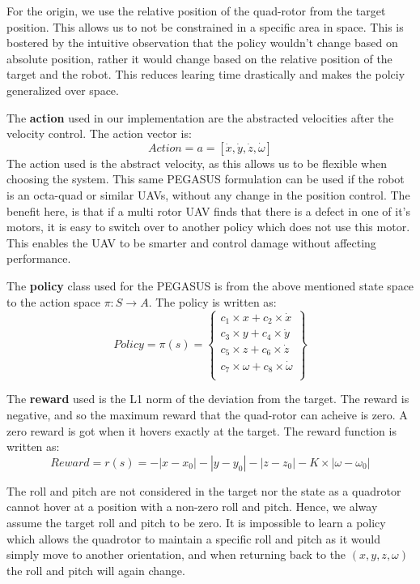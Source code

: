 \documentclass[BTech]{iitmdiss}
\begin{document}
For the origin, we use the relative position of the quad-rotor from the target position. This allows us to not be constrained in a specific area in space. This is bostered by the intuitive observation that the policy wouldn't change based on absolute position, rather it would change based on the relative position of the target and the robot. This reduces learing time drastically and makes the polciy generalized over space.

The {\bf action} used in our implementation are the abstracted velocities after the velocity control. The action vector is:
\begin{equation}
  Action = a = [\dot{x}, \dot{y}, \dot{z}, \dot{\omega}]
\end{equation}
The action used is the abstract velocity, as this allows us to be flexible when choosing the system. This same PEGASUS formulation can be used if the robot is an octa-quad or similar UAVs, without any change in the position control. The benefit here, is that if a multi rotor UAV finds that there is a defect in one of it's motors, it is easy to switch over to another policy which does not use this motor. This enables the UAV to be smarter and control damage without affecting performance.

The {\bf policy} class used for the PEGASUS is from the above mentioned state space to the action space $\pi: S \rightarrow A$. The policy is written as:
\begin{equation}
  Policy = \pi(s) = \left\{
    \begin{array}{c}
      c_1 \times x + c_2 \times \dot{x} \\
      c_3 \times y + c_4 \times \dot{y} \\
      c_5 \times z + c_6 \times \dot{z} \\
      c_7 \times \omega + c_8 \times \dot{\omega} \\
    \end{array}
  \right\}
\end{equation}


The {\bf reward} used is the L1 norm of the deviation from the target. The reward is negative, and so the maximum reward that the quad-rotor can acheive is zero. A zero reward is got when it hovers exactly at the target. The reward function is written as:
\begin{equation}
  Reward = r(s) = - |x - x_0| - |y - y_0| - |z - z_0| - K \times |\omega - \omega_0|
\end{equation}

The roll and pitch are not considered in the target nor the state as a quadrotor cannot hover at a position with a non-zero roll and pitch. Hence, we alway assume the target roll and pitch to be zero. It is impossible to learn a policy which allows the quadrotor to maintain a specific roll and pitch as it would simply move to another orientation, and when returning back to the $(x, y, z, \omega)$ the roll and pitch will again change.
\end{document}
